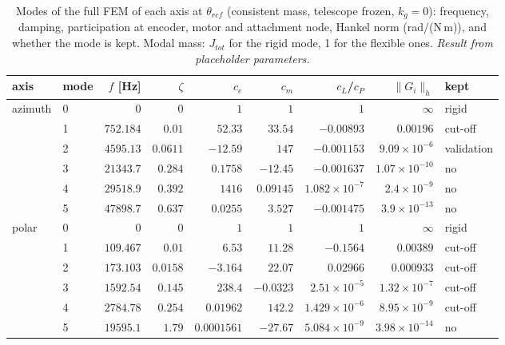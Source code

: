 \documentclass[10pt,a4paper]{article}
\numberwithin{equation}{section}
\begin{document}
\begin{table}[H]\centering\small
\caption{Modes of the full FEM of each axis at $\theta_{ref}$ (consistent mass, telescope frozen, $k_g = 0$): frequency, damping, participation at encoder, motor and attachment node, Hankel norm (rad/(N\,m)), and whether the mode is kept. Modal mass: $J_{tot}$ for the rigid mode, 1 for the flexible ones. \emph{Result from placeholder parameters.}}\label{tab:modal_modes}
\begin{tabular}{llrrrrrrl}\toprule
axis & mode & $f$ [Hz] & $\zeta$ & $c_e$ & $c_m$ & $c_{L}$/$c_P$ & $\|G_i\|_h$ & kept \\ \midrule
azimuth & 0 & $0$ & $0$ & $1$ & $1$ & $1$ & $\infty$ & rigid \\
 & 1 & $752.184$ & $0.01$ & $52.33$ & $33.54$ & $-0.00893$ & $0.00196$ & cut-off \\
 & 2 & $4595.13$ & $0.0611$ & $-12.59$ & $147$ & $-0.001153$ & $9.09\times10^{-6}$ & validation \\
 & 3 & $21343.7$ & $0.284$ & $0.1758$ & $-12.45$ & $-0.001637$ & $1.07\times10^{-10}$ & no \\
 & 4 & $29518.9$ & $0.392$ & $1416$ & $0.09145$ & $1.082\times10^{-7}$ & $2.4\times10^{-9}$ & no \\
 & 5 & $47898.7$ & $0.637$ & $0.0255$ & $3.527$ & $-0.001475$ & $3.9\times10^{-13}$ & no \\
\midrule
polar & 0 & $0$ & $0$ & $1$ & $1$ & $1$ & $\infty$ & rigid \\
 & 1 & $109.467$ & $0.01$ & $6.53$ & $11.28$ & $-0.1564$ & $0.00389$ & cut-off \\
 & 2 & $173.103$ & $0.0158$ & $-3.164$ & $22.07$ & $0.02966$ & $0.000933$ & cut-off \\
 & 3 & $1592.54$ & $0.145$ & $238.4$ & $-0.0323$ & $2.51\times10^{-5}$ & $1.32\times10^{-7}$ & cut-off \\
 & 4 & $2784.78$ & $0.254$ & $0.01962$ & $142.2$ & $1.429\times10^{-6}$ & $8.95\times10^{-9}$ & cut-off \\
 & 5 & $19595.1$ & $1.79$ & $0.0001561$ & $-27.67$ & $5.084\times10^{-9}$ & $3.98\times10^{-14}$ & no \\

\bottomrule\end{tabular}\end{table}
\end{document}
